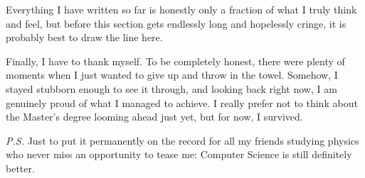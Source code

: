 \documentclass[english, oneside]{sapthesis}
\begin{document}
\begin{acknowledgments}
\medskip

Everything I have written so far is honestly only a fraction of what I truly think and feel, but before this section gets endlessly long and hopelessly cringe, it is probably best to draw the line here.

\medskip

Finally, I have to thank myself. To be completely honest, there were plenty of moments when I just wanted to give up and throw in the towel. Somehow, I stayed stubborn enough to see it through, and looking back right now, I am genuinely proud of what I managed to achieve. I really prefer not to think about the Master's degree looming ahead just yet, but for now, I survived.

\medskip

\textit{P.S.} Just to put it permanently on the record for all my friends studying physics who never miss an opportunity to tease me: Computer Science is still definitely better.
\end{acknowledgments}
\end{document}
